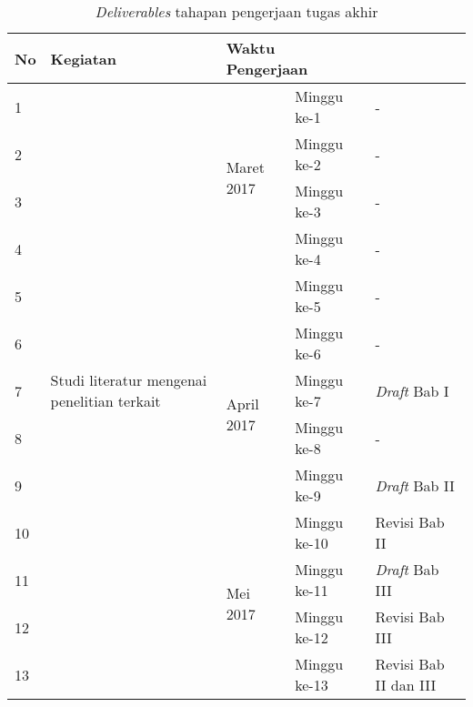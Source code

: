 \begin {table}[H]
\begin{center}
\caption {\emph{Deliverables} tahapan pengerjaan tugas akhir}
\begin{tabular}{|p{.5cm}|l|l|l|l|}

\hline
No & Kegiatan & \multicolumn{2}{|l|}{Waktu Pengerjaan} & \\
\hline

1 & \multirow{13}{2.5cm}{Studi literatur mengenai penelitian terkait} & \multirow{4}{*}{Maret 2017} & Minggu ke-1 & - \\
\cline{1-1} \cline{4-5}

2 & & & Minggu ke-2 & - \\
\cline{1-1} \cline{4-5}

3 & & & Minggu ke-3 & - \\
\cline{1-1} \cline{4-5}

4 & & & Minggu ke-4 & - \\
\cline{1-1} \cline{4-5}

5 & & & Minggu ke-5 & - \\
\cline{1-1} \cline{3-5}

6 & & \multirow{4}{*}{April 2017} & Minggu ke-6 & - \\
\cline{1-1} \cline{4-5}

7 & & & Minggu ke-7 & \emph{Draft} Bab I \\
\cline{1-1} \cline{4-5}

8 & & & Minggu ke-8 & - \\
\cline{1-1} \cline{4-5}

9 & & & Minggu ke-9 & \emph{Draft} Bab II \\
\cline{1-1} \cline{4-5}

10 & & \multirow{4}{*}{Mei 2017} & Minggu ke-10 & Revisi Bab II \\
\cline{1-1} \cline{3-5}

11 & & & Minggu ke-11 & \emph{Draft} Bab III \\
\cline{1-1} \cline{4-5}

12 & & & Minggu ke-12 & Revisi Bab III \\
\cline{1-1} \cline{4-5}

13 & & & Minggu ke-13 & Revisi Bab II dan III \\
\hline

\end{tabular}
\end{center}
\end{table}
